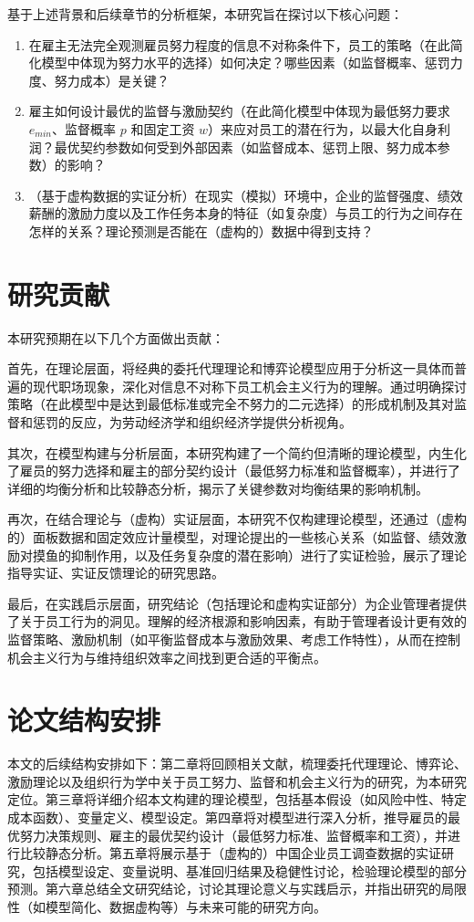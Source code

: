 基于上述背景和后续章节的分析框架，本研究旨在探讨以下核心问题：

\begin{enumerate}
    \item 在雇主无法完全观测雇员努力程度的信息不对称条件下，员工的策略（在此简化模型中体现为努力水平的选择）如何决定？哪些因素（如监督概率、惩罚力度、努力成本）是关键？
    \item 雇主如何设计最优的{监督}与{激励}契约（在此简化模型中体现为最低努力要求 $e_{min}$、监督概率 $p$ 和固定工资 $w$）来应对员工的潜在行为，以最大化自身利润？最优契约参数如何受到外部因素（如监督成本、惩罚上限、努力成本参数）的影响？
    \item （基于虚构数据的实证分析）在现实（模拟）环境中，企业的监督强度、绩效薪酬的激励力度以及工作任务本身的特征（如复杂度）与员工的行为之间存在怎样的关系？理论预测是否能在（虚构的）数据中得到支持？
\end{enumerate}

\section{研究贡献}

本研究预期在以下几个方面做出贡献：

首先，在{理论层面}，将经典的{委托代理理论}和{博弈论}模型应用于分析这一具体而普遍的现代职场现象，深化对信息不对称下员工机会主义行为的理解。通过明确探讨策略（在此模型中是达到最低标准或完全不努力的二元选择）的形成机制及其对监督和惩罚的反应，为劳动经济学和组织经济学提供分析视角。

其次，在{模型构建与分析层面}，本研究构建了一个简约但清晰的理论模型，内生化了雇员的努力选择和雇主的部分契约设计（最低努力标准和监督概率），并进行了详细的均衡分析和比较静态分析，揭示了关键参数对均衡结果的影响机制。

再次，在{结合理论与（虚构）实证层面}，本研究不仅构建理论模型，还通过（虚构的）面板数据和固定效应计量模型，对理论提出的一些核心关系（如监督、绩效激励对摸鱼的抑制作用，以及任务复杂度的潜在影响）进行了实证检验，展示了理论指导实证、实证反馈理论的研究思路。

最后，在{实践启示层面}，研究结论（包括理论和虚构实证部分）为企业管理者提供了关于员工行为的洞见。理解的经济根源和影响因素，有助于管理者设计更有效的监督策略、激励机制（如平衡监督成本与激励效果、考虑工作特性），从而在控制机会主义行为与维持组织效率之间找到更合适的平衡点。

\section{论文结构安排}

本文的后续结构安排如下：第二章将回顾相关文献，梳理委托代理理论、博弈论、激励理论以及组织行为学中关于员工努力、监督和机会主义行为的研究，为本研究定位。第三章将详细介绍本文构建的理论模型，包括基本假设（如风险中性、特定成本函数）、变量定义、模型设定。第四章将对模型进行深入分析，推导雇员的最优努力决策规则、雇主的最优契约设计（最低努力标准、监督概率和工资），并进行比较静态分析。第五章将展示基于（虚构的）中国企业员工调查数据的实证研究，包括模型设定、变量说明、基准回归结果及稳健性讨论，检验理论模型的部分预测。第六章总结全文研究结论，讨论其理论意义与实践启示，并指出研究的局限性（如模型简化、数据虚构等）与未来可能的研究方向。